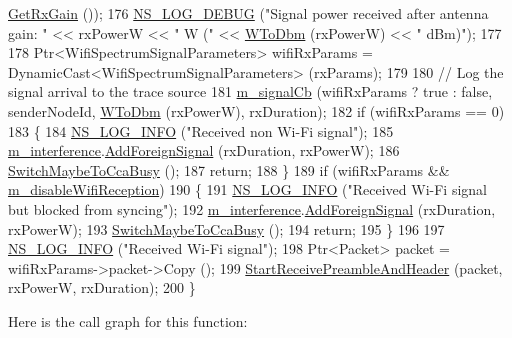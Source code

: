 \begin{DoxyCode}
      \hyperlink{classns3_1_1WifiPhy_ac794a3605ed0524f4182d0b72bee9049}{GetRxGain} ());
176   \hyperlink{group__logging_ga413f1886406d49f59a6a0a89b77b4d0a}{NS\_LOG\_DEBUG} (\textcolor{stringliteral}{"Signal power received after antenna gain: "} << rxPowerW << \textcolor{stringliteral}{" W ("} << 
      \hyperlink{namespacens3_a256abf4ba6bab6e20f8419fff00e73e2}{WToDbm} (rxPowerW) << \textcolor{stringliteral}{" dBm)"});
177 
178   Ptr<WifiSpectrumSignalParameters> wifiRxParams = DynamicCast<WifiSpectrumSignalParameters> (rxParams);
179 
180   \textcolor{comment}{// Log the signal arrival to the trace source}
181   \hyperlink{classns3_1_1SpectrumWifiPhy_a0be57ff837cdbd31902f670ea5bbabe2}{m\_signalCb} (wifiRxParams ? \textcolor{keyword}{true} : \textcolor{keyword}{false}, senderNodeId, \hyperlink{namespacens3_a256abf4ba6bab6e20f8419fff00e73e2}{WToDbm} (rxPowerW), rxDuration);
182   \textcolor{keywordflow}{if} (wifiRxParams == 0)
183     \{
184       \hyperlink{group__logging_gafbd73ee2cf9f26b319f49086d8e860fb}{NS\_LOG\_INFO} (\textcolor{stringliteral}{"Received non Wi-Fi signal"});
185       \hyperlink{classns3_1_1WifiPhy_a55909109ad2e2759702336770fa90119}{m\_interference}.\hyperlink{classns3_1_1InterferenceHelper_ae40497433692e4917a86a56e4054efce}{AddForeignSignal} (rxDuration, rxPowerW);
186       \hyperlink{classns3_1_1WifiPhy_a75f5905e356d1cdff251043fa10c158e}{SwitchMaybeToCcaBusy} ();
187       \textcolor{keywordflow}{return};
188     \}
189   \textcolor{keywordflow}{if} (wifiRxParams && \hyperlink{classns3_1_1SpectrumWifiPhy_aceccd3aa8c8e75ac9c136b089a10176b}{m\_disableWifiReception})
190     \{
191       \hyperlink{group__logging_gafbd73ee2cf9f26b319f49086d8e860fb}{NS\_LOG\_INFO} (\textcolor{stringliteral}{"Received Wi-Fi signal but blocked from syncing"});
192       \hyperlink{classns3_1_1WifiPhy_a55909109ad2e2759702336770fa90119}{m\_interference}.\hyperlink{classns3_1_1InterferenceHelper_ae40497433692e4917a86a56e4054efce}{AddForeignSignal} (rxDuration, rxPowerW);
193       \hyperlink{classns3_1_1WifiPhy_a75f5905e356d1cdff251043fa10c158e}{SwitchMaybeToCcaBusy} ();
194       \textcolor{keywordflow}{return};
195     \}
196 
197   \hyperlink{group__logging_gafbd73ee2cf9f26b319f49086d8e860fb}{NS\_LOG\_INFO} (\textcolor{stringliteral}{"Received Wi-Fi signal"});
198   Ptr<Packet> packet = wifiRxParams->packet->Copy ();
199   \hyperlink{classns3_1_1WifiPhy_a3a6e284a02ba090313098f1713a579e4}{StartReceivePreambleAndHeader} (packet, rxPowerW, rxDuration);
200 \}
\end{DoxyCode}


Here is the call graph for this function\+:




